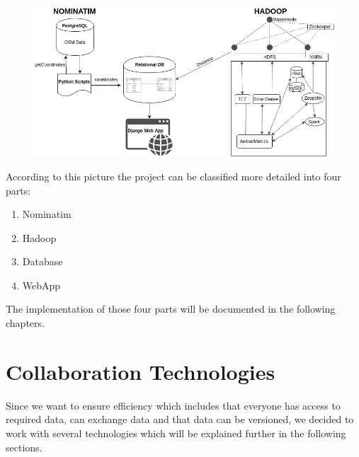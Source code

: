 \documentclass[12pt]{article}
\begin{document}
\begin{figure}[H]
\hspace{-0.9cm}
\includegraphics[width=1.1\textwidth]{img/big}
\label{fig:big}
\end{figure}
\noindent According to this picture the project can be classified more detailed into four parts:
\begin{enumerate}
\item Nominatim
\item Hadoop
\item Database
\item WebApp
\end{enumerate}
The implementation of those four parts will be documented in the following chapters.
\section{Collaboration Technologies}
Since we want to ensure efficiency which includes that everyone has access to required data, can exchange data and that data can be versioned,  we decided to work with several technologies which will be explained further in the following sections.
\end{document}
